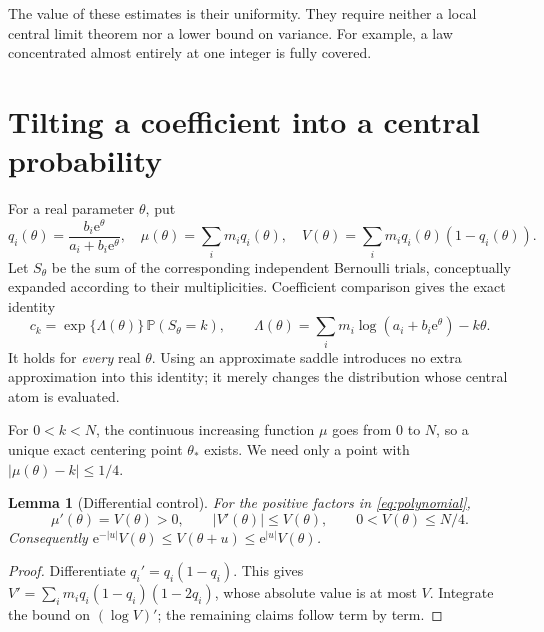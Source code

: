 \documentclass[11pt,a4paper]{article}
\newtheorem{lemma}[theorem]{Lemma}
\theoremstyle{definition}
\newcommand{\Prob}{\mathbb P}
\newcommand{\ee}{\mathrm e}
\newcommand{\abs}[1]{\left|#1\right|}
\begin{document}
The value of these estimates is their uniformity. They require neither a local central limit theorem nor a lower bound on variance. For example, a law concentrated almost entirely at one integer is fully covered.

\section{Tilting a coefficient into a central probability}\label{sec:tilt}

For a real parameter $\theta$, put
\begin{equation}\label{eq:tiltedq}
 q_i(\theta)=\frac{b_i\ee^\theta}{a_i+b_i\ee^\theta},\quad
 \mu(\theta)=\sum_i m_iq_i(\theta),\quad
 V(\theta)=\sum_i m_iq_i(\theta)(1-q_i(\theta)).
\end{equation}
Let $S_\theta$ be the sum of the corresponding independent Bernoulli trials, conceptually expanded according to their multiplicities. Coefficient comparison gives the exact identity
\begin{equation}\label{eq:untilt}
 c_k=\exp\{\Lambda(\theta)\}\,\Prob(S_\theta=k),\qquad
 \Lambda(\theta)=\sum_i m_i\log(a_i+b_i\ee^\theta)-k\theta.
\end{equation}
It holds for \emph{every} real $\theta$. Using an approximate saddle introduces no extra approximation into this identity; it merely changes the distribution whose central atom is evaluated.

For $0<k<N$, the continuous increasing function $\mu$ goes from $0$ to $N$, so a unique exact centering point $\theta_*$ exists. We need only a point with $\abs{\mu(\theta)-k}\le1/4$.

\begin{lemma}[Differential control]\label{lem:logvariance}
For the positive factors in \eqref{eq:polynomial},
\[
 \mu'(\theta)=V(\theta)>0,\qquad
 \abs{V'(\theta)}\le V(\theta),\qquad
 0<V(\theta)\le N/4.
\]
Consequently $\ee^{-\abs{u}}V(\theta)\le V(\theta+u)\le\ee^{\abs{u}}V(\theta)$.
\end{lemma}
\begin{proof}
Differentiate $q_i'=q_i(1-q_i)$. This gives
$V'=\sum_i m_iq_i(1-q_i)(1-2q_i)$, whose absolute value is at most $V$. Integrate the bound on $(\log V)'$; the remaining claims follow term by term.
\end{proof}
\end{document}
